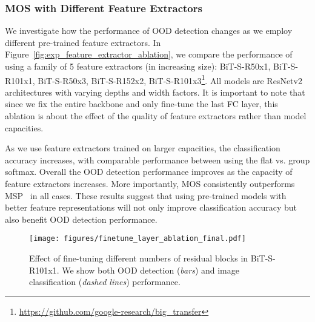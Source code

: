 \documentclass[final]{cvpr}
\begin{document}
\subsubsection{MOS with Different Feature Extractors}
\label{sec:extractor_ablation}
\vspace{-0.2cm}
We investigate how the performance of OOD detection changes as we employ different pre-trained feature extractors.
In Figure~\ref{fig:exp_feature_extractor_ablation},  we compare the performance of using a family of 5 feature extractors (in increasing size): BiT-S-R50x1, BiT-S-R101x1, BiT-S-R50x3, BiT-S-R152x2, BiT-S-R101x3\footnote{\url{https://github.com/google-research/big_transfer}}. All models are ResNetv2 architectures with varying depths and width factors. It is important to note that since we fix the entire backbone and only fine-tune the last FC layer, this ablation is about the effect of the quality of feature extractors rather than model capacities.

As we use feature extractors trained on larger capacities, the classification accuracy increases, with comparable performance between using the flat vs. group softmax. Overall the OOD detection performance improves as the capacity of feature extractors increases. More importantly, MOS consistently outperforms MSP~\cite{hendrycks2016baseline} in all cases. These results suggest that using pre-trained models with better feature representations will not only improve classification accuracy but also benefit OOD detection performance.

\begin{figure*}[t]
    \centering
    \texttt{[image: figures/finetune\_layer\_ablation\_final.pdf]}
    \caption{\small{Effect of fine-tuning different numbers of residual blocks in BiT-S-R101x1. We show both OOD detection (\textit{bars}) and image classification (\textit{dashed lines}) performance.}}
    \vspace{-0.2cm}
    \label{fig:exp_finetune_layer_ablation}
\end{figure*}

\vspace{-0.4cm}
\end{document}
